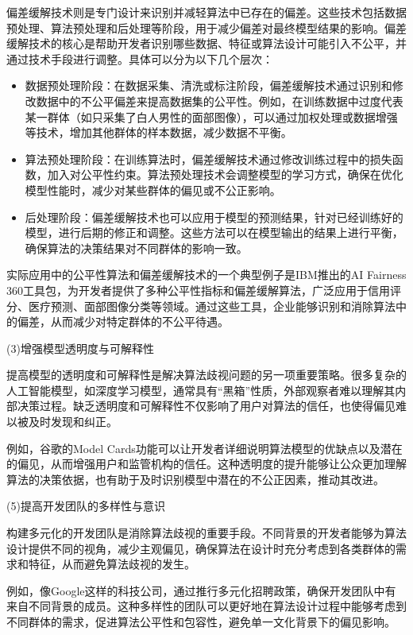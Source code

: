 偏差缓解技术则是专门设计来识别并减轻算法中已存在的偏差。这些技术包括数据预处理、算法预处理和后处理等阶段，用于减少偏差对最终模型结果的影响。偏差缓解技术的核心是帮助开发者识别哪些数据、特征或算法设计可能引入不公平，并通过技术手段进行调整。具体可以分为以下几个层次：
\begin{itemize}
    \item 数据预处理阶段：在数据采集、清洗或标注阶段，偏差缓解技术通过识别和修改数据中的不公平偏差来提高数据集的公平性。例如，在训练数据中过度代表某一群体（如只采集了白人男性的面部图像），可以通过加权处理或数据增强等技术，增加其他群体的样本数据，减少数据不平衡。
    \item 算法预处理阶段：在训练算法时，偏差缓解技术通过修改训练过程中的损失函数，加入对公平性约束。算法预处理技术会调整模型的学习方式，确保在优化模型性能时，减少对某些群体的偏见或不公正影响。
    \item 后处理阶段：偏差缓解技术也可以应用于模型的预测结果，针对已经训练好的模型，进行后期的修正和调整。这些方法可以在模型输出的结果上进行平衡，确保算法的决策结果对不同群体的影响一致。
\end{itemize}

实际应用中的公平性算法和偏差缓解技术的一个典型例子是IBM推出的AI Fairness 360工具包，为开发者提供了多种公平性指标和偏差缓解算法，广泛应用于信用评分、医疗预测、面部图像分类等领域。通过这些工具，企业能够识别和消除算法中的偏差，从而减少对特定群体的不公平待遇。

(3)增强模型透明度与可解释性

提高模型的透明度和可解释性是解决算法歧视问题的另一项重要策略。很多复杂的人工智能模型，如深度学习模型，通常具有“黑箱”性质，外部观察者难以理解其内部决策过程。缺乏透明度和可解释性不仅影响了用户对算法的信任，也使得偏见难以被及时发现和纠正。

例如，谷歌的Model Cards功能可以让开发者详细说明算法模型的优缺点以及潜在的偏见，从而增强用户和监管机构的信任。这种透明度的提升能够让公众更加理解算法的决策依据，也有助于及时识别模型中潜在的不公正因素，推动其改进。

(5)提高开发团队的多样性与意识

构建多元化的开发团队是消除算法歧视的重要手段。不同背景的开发者能够为算法设计提供不同的视角，减少主观偏见，确保算法在设计时充分考虑到各类群体的需求和特征，从而避免算法歧视的发生。

例如，像Google这样的科技公司，通过推行多元化招聘政策，确保开发团队中有来自不同背景的成员。这种多样性的团队可以更好地在算法设计过程中能够考虑到不同群体的需求，促进算法公平性和包容性，避免单一文化背景下的偏见影响。

